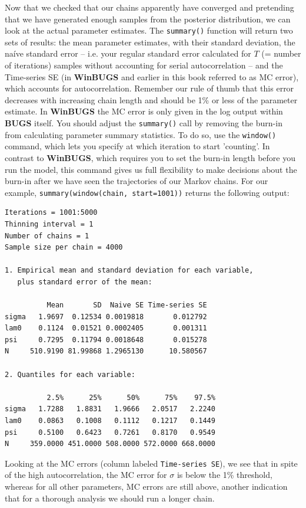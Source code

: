 Now that we checked that our chains apparently have converged and pretending 
that we have generated enough samples from the posterior distribution, we 
can look at the actual parameter estimates. The \verb#summary()# function 
will return two sets of results: the mean parameter estimates, with their standard deviation, the na\'{i}ve standard error -- i.e. your regular standard error calculated for $T$ (= number of iterations) 
samples without 
accounting for serial autocorrelation -- and the 
Time-series SE (in {\bf WinBUGS} 
and earlier in this book referred to as MC error), which accounts for 
autocorrelation. Remember our rule of thumb that this error 
decreases with increasing chain length and should be 1\% or less of the 
parameter estimate. In {\bf WinBUGS} the MC error is only given in the log 
output within {\bf BUGS} itself.
You should adjust the \verb#summary()# call by removing the burn-in from
calculating parameter summary statistics. To do so, use the \verb#window()#
command, which lets you specify at which iteration to start
'counting'. In contrast to {\bf WinBUGS}, which requires you to set the
burn-in length before you run the model, this command gives us full
flexibility to make decisions about the burn-in after we have seen the
trajectories of our Markov chains. For our example,
\verb#summary(window(chain, start=1001))# returns the following output:

{\small
\begin{verbatim}
Iterations = 1001:5000
Thinning interval = 1 
Number of chains = 1 
Sample size per chain = 4000 

1. Empirical mean and standard deviation for each variable,
   plus standard error of the mean:

          Mean       SD  Naive SE Time-series SE
sigma   1.9697  0.12534 0.0019818       0.012792
lam0    0.1124  0.01521 0.0002405       0.001311
psi     0.7295  0.11794 0.0018648       0.015278
N     510.9190 81.99868 1.2965130      10.580567

2. Quantiles for each variable:

          2.5%      25%      50%      75%    97.5%
sigma   1.7288   1.8831   1.9666   2.0517   2.2240
lam0    0.0863   0.1008   0.1112   0.1217   0.1449
psi     0.5100   0.6423   0.7261   0.8170   0.9549
N     359.0000 451.0000 508.0000 572.0000 668.0000
\end{verbatim}
}

Looking at the MC errors (column labeled \mbox{\tt Time-series SE}), 
we see that in spite of the high autocorrelation, the MC error for 
$\sigma$ is below the 1\% threshold, whereas for all other parameters, 
MC errors are still above, another indication that for a thorough 
analysis we should run a longer chain.

